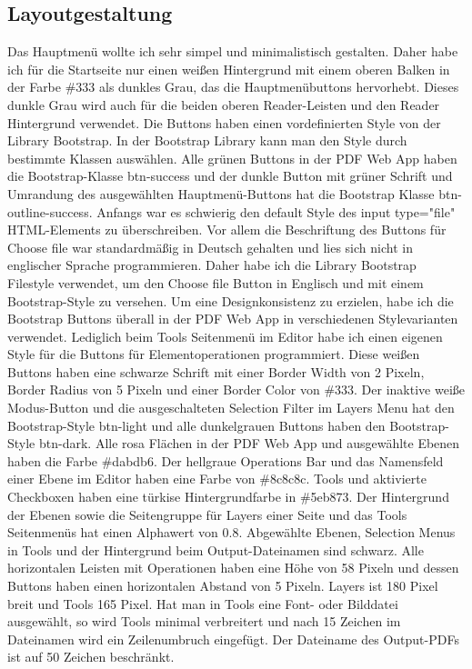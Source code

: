 \subsection{Layoutgestaltung}
Das Hauptmenü wollte ich sehr simpel und minimalistisch gestalten. Daher habe ich für die Startseite nur einen weißen Hintergrund mit einem oberen Balken in der Farbe \#333 als dunkles Grau, das die Hauptmenübuttons hervorhebt. Dieses dunkle Grau wird auch für die beiden oberen Reader-Leisten und den Reader Hintergrund verwendet. Die Buttons haben einen vordefinierten Style von der Library Bootstrap. In der Bootstrap Library kann man den Style durch bestimmte Klassen auswählen. Alle grünen Buttons in der PDF Web App haben die Bootstrap-Klasse btn-success und der dunkle Button mit grüner Schrift und Umrandung des ausgewählten Hauptmenü-Buttons hat die Bootstrap Klasse btn-outline-success. Anfangs war es schwierig den default Style des input type="file" HTML-Elements zu überschreiben. Vor allem die Beschriftung des Buttons für Choose file war standardmäßig in Deutsch gehalten und lies sich nicht in englischer Sprache programmieren. Daher habe ich die Library Bootstrap Filestyle verwendet, um den Choose file Button in Englisch und mit einem Bootstrap-Style zu versehen. Um eine Designkonsistenz zu erzielen, habe ich die Bootstrap Buttons überall in der PDF Web App in verschiedenen Stylevarianten verwendet. Lediglich beim Tools Seitenmenü im Editor habe ich einen eigenen Style für die Buttons für Elementoperationen programmiert. Diese weißen Buttons haben eine schwarze Schrift mit einer Border Width von 2 Pixeln, Border Radius von 5 Pixeln und einer Border Color von \#333. Der inaktive weiße Modus-Button und die ausgeschalteten Selection Filter im Layers Menu hat den Bootstrap-Style btn-light und alle dunkelgrauen Buttons haben den Bootstrap-Style btn-dark. Alle rosa Flächen in der PDF Web App und ausgewählte Ebenen haben die Farbe \#dabdb6. Der hellgraue Operations Bar und das Namensfeld einer Ebene im Editor haben eine Farbe von \#8c8c8c. Tools und aktivierte Checkboxen haben eine türkise Hintergrundfarbe in \#5eb873. Der Hintergrund der Ebenen sowie die Seitengruppe für Layers einer Seite und das Tools Seitenmenüs hat einen Alphawert von 0.8. Abgewählte Ebenen, Selection Menus in Tools und der Hintergrund beim Output-Dateinamen sind schwarz. Alle horizontalen Leisten mit Operationen haben eine Höhe von 58 Pixeln und dessen Buttons haben einen horizontalen Abstand von 5 Pixeln. Layers ist 180 Pixel breit und Tools 165 Pixel. Hat man in Tools eine Font- oder Bilddatei ausgewählt, so wird Tools minimal verbreitert und nach 15 Zeichen im Dateinamen wird ein Zeilenumbruch eingefügt. Der Dateiname des Output-PDFs ist auf 50 Zeichen beschränkt. 



